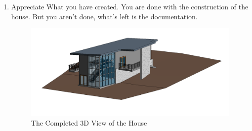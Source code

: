 \documentclass{tufte-book} %
\begin{document}
\begin{enumerate}
	\item Appreciate What you have created. You are done with the construction of the house. But you aren't done, what's left is the documentation.
	
	\begin{figure}
		\includegraphics[width=\linewidth]{revitfinalthreed.png}
		\caption{The Completed 3D View of the House}
		\label{fig:revthreedfinalhouse}
	\end{figure}
\end{enumerate}
\end{document}
